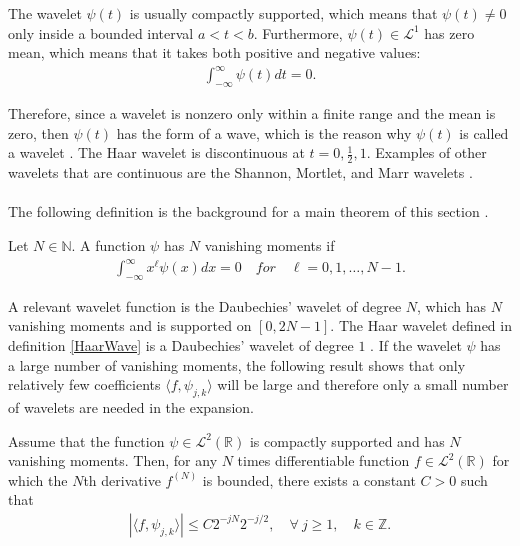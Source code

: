 The wavelet $\psi(t)$ is usually compactly supported, which means that $\psi(t) \neq 0$ only inside a bounded interval $a < t < b$. Furthermore, $\psi(t) \in \mathcal{L}^1$ has zero mean, which means that it takes both positive and negative values:
\begin{align*}
\int_{-\infty}^\infty \psi(t) dt = 0.
\end{align*}

Therefore, since a wavelet is nonzero only within a finite range and the mean is zero, then $\psi(t)$ has the form of a wave, which is the reason why $\psi(t)$ is called a wavelet \cite{page 411, Wang} . The Haar wavelet is discontinuous at $t = 0, \frac{1}{2}, 1$. Examples of other wavelets that are continuous are the Shannon, Mortlet, and Marr wavelets \cite{page 417-420, Wang}.
\\ \\
The following definition is the background for a main theorem of this section \cite{page 170, FSE2010}.

\begin{definition}
Let $N \in \mathbb{N}$. A function $\psi$ has $N$ vanishing moments if
\begin{align*}
\int_{-\infty}^\infty x^\ell \psi(x) dx = 0 \quad for \quad \ell = 0, 1, \dots, N-1.
\end{align*}
\end{definition}

A relevant wavelet function is the Daubechies' wavelet of degree $N$, which has $N$ vanishing moments and is supported on $[0,2N-1]$. The Haar wavelet defined in definition \ref{HaarWave} is a Daubechies' wavelet of degree $1$ \cite{page 174, FSE2010}. If the wavelet $\psi$ has a large number of vanishing moments, the following result shows that only relatively few coefficients $\langle f, \psi_{j,k} \rangle$ will be large and therefore only a small number of wavelets are needed in the expansion.

\begin{theorem}
Assume that the function $\psi \in \mathcal{L}^2(\mathbb{R})$ is compactly supported and has $N$ vanishing moments. Then, for any $N$ times differentiable function $f \in \mathcal{L}^2(\mathbb{R})$ for which the $N$th derivative $f^{(N)}$ is bounded, there exists a constant $C > 0$ such that
\begin{align} \label{eq:decay_wave_coeff}
|\langle f, \psi_{j,k} \rangle| \leq C 2^{-jN} 2^{-j/2}, \quad \forall \ j \geq 1, \quad k \in \mathbb{Z}.
\end{align}
\end{theorem}

